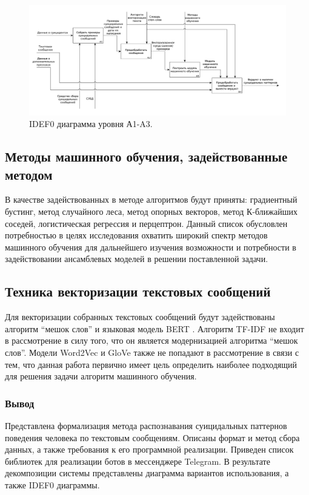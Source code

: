\begin{figure}[H]
	\centering
	\includegraphics[width=\textwidth]{inc/A1.pdf}
	\caption{ IDEF0 диаграмма уровня А1-A3. }
	\label{img:idef1}
\end{figure}

\subsection{Методы машинного обучения, задействованные методом}

В качестве задействованных в методе алгоритмов будут приняты: градиентный бустинг, метод случайного леса, метод опорных векторов, метод К-ближайших соседей, логистическая регрессия и перцептрон. Данный список обусловлен потребностью в целях исследования охватить широкий спектр методов машинного обучения для дальнейшего изучения возможности и потребности в задействовании ансамблевых моделей в решении поставленной задачи.

\subsection{Техника векторизации текстовых сообщений}

Для векторизации собранных текстовых сообщений будут задействованы алгоритм ``мешок слов'' и языковая модель BERT \cite{bert}. Алгоритм TF-IDF не входит в рассмотрение в силу того, что он является модернизацией алгоритма ``мешок слов''. Модели Word2Vec \cite{word2vec} и GloVe \cite{glove} также не попадают в рассмотрение в связи с тем, что данная работа первично имеет цель определить наиболее подходящий для решения задачи алгоритм машинного обучения.

\subsubsection*{Вывод}

Представлена формализация метода распознавания суицидальных паттернов поведения человека по текстовым сообщениям. Описаны формат и метод сбора данных, а также требования к его программной реализации. Приведен список библиотек для реализации ботов в мессенджере Telegram. В результате декомпозиции системы представлены диаграмма вариантов использования, а также IDEF0 диаграммы.

\pagebreak